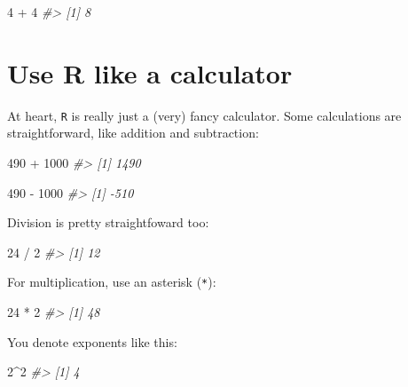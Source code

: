 \documentclass[
]{book}
\newenvironment{Shaded}{\begin{snugshade}}{\end{snugshade}}
\newcommand{\CommentTok}[1]{\textcolor[rgb]{0.56,0.35,0.01}{\textit{#1}}}
\newcommand{\DecValTok}[1]{\textcolor[rgb]{0.00,0.00,0.81}{#1}}
\newcommand{\SpecialCharTok}[1]{\textcolor[rgb]{0.00,0.00,0.00}{#1}}
\begin{document}
\begin{Shaded}
\begin{Highlighting}[]
\DecValTok{4} \SpecialCharTok{+} \DecValTok{4}
\CommentTok{\#\textgreater{} [1] 8}
\end{Highlighting}
\end{Shaded}

\hypertarget{use-r-like-a-calculator}{%
\section*{Use R like a calculator}\label{use-r-like-a-calculator}}

At heart, \texttt{R} is really just a (very) fancy calculator. Some calculations are straightforward, like addition and subtraction:

\begin{Shaded}
\begin{Highlighting}[]
\DecValTok{490} \SpecialCharTok{+} \DecValTok{1000}
\CommentTok{\#\textgreater{} [1] 1490}
\end{Highlighting}
\end{Shaded}

\begin{Shaded}
\begin{Highlighting}[]
\DecValTok{490} \SpecialCharTok{{-}} \DecValTok{1000}
\CommentTok{\#\textgreater{} [1] {-}510}
\end{Highlighting}
\end{Shaded}

Division is pretty straightfoward too:

\begin{Shaded}
\begin{Highlighting}[]
\DecValTok{24} \SpecialCharTok{/} \DecValTok{2}
\CommentTok{\#\textgreater{} [1] 12}
\end{Highlighting}
\end{Shaded}

For multiplication, use an asterisk (\texttt{*}):

\begin{Shaded}
\begin{Highlighting}[]
\DecValTok{24} \SpecialCharTok{*} \DecValTok{2}
\CommentTok{\#\textgreater{} [1] 48}
\end{Highlighting}
\end{Shaded}

You denote exponents like this:

\begin{Shaded}
\begin{Highlighting}[]
\DecValTok{2}\SpecialCharTok{\^{}}\DecValTok{2}
\CommentTok{\#\textgreater{} [1] 4}
\end{Highlighting}
\end{Shaded}
\end{document}
